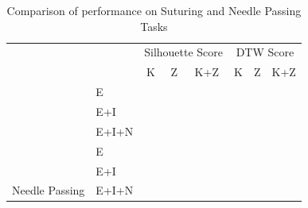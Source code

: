 \begin{table}[ht]
\centering
\caption{Comparison of \TSC performance on Suturing and Needle Passing Tasks}
\label{tab:jigsaws}
\begin{tabular}{ll|l|l|l|l|l|l}
\multicolumn{2}{c}{}                                     &     \multicolumn{3}{c}{\cellcolor[HTML]{CBCEFB}Silhouette Score} & \multicolumn{3}{c}{\cellcolor[HTML]{FFC72C}DTW Score}\\
\multicolumn{2}{c}{}    & \multicolumn{1}{c|}{K} & \multicolumn{1}{c|}{Z} & \multicolumn{1}{c|}{K+Z}& \multicolumn{1}{c|}{K} & \multicolumn{1}{c|}{Z} & \multicolumn{1}{c}{K+Z} \\ \hline \hline 
\rowcolor[HTML]{E0E0E0}
\cellcolor[HTML]{CBCEFB}                                 & E     & &    &   &   &  &    \\ 
\cellcolor[HTML]{CBCEFB}                                 & E+I   & &    &   &   &  &    \\ 
\rowcolor[HTML]{E0E0E0}
\multirow{-3}{*}{\cellcolor[HTML]{CBCEFB}Suturing}       & E+I+N & &    &   &   &  &    \\ 
\cellcolor[HTML]{FFC72C}                                 & E     & &    &   &   &  &    \\ 
\rowcolor[HTML]{E0E0E0}
\cellcolor[HTML]{FFC72C}                                 & E+I   & &    &   &   &  &    \\ 
\multirow{-3}{*}{\cellcolor[HTML]{FFC72C}Needle Passing} & E+I+N & &    &   &   &  &    \\ \hline
\end{tabular}
\end{table}

